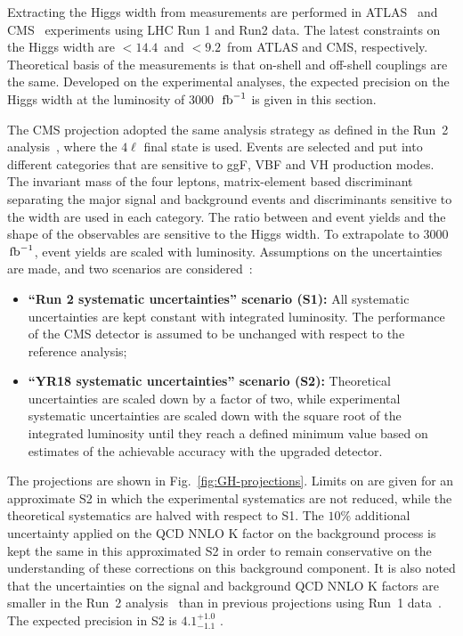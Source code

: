 
Extracting the Higgs width from \offshell measurements are performed in ATLAS~\cite{Aaboud:2018puo} and CMS~\cite{CMS:2018bwq} experiments using LHC Run 1 and Run2 data. The latest constraints on the Higgs width are $< 14.4$~\UMeV and $<9.2$~\UMeV from ATLAS and CMS, respectively. Theoretical basis of the measurements is that on-shell and off-shell couplings are the same. Developed on the experimental analyses, the expected precision on the Higgs width at the luminosity of 3000~$\,{\rm fb}^{-1}$ is given in this section.  

The CMS projection adopted the same analysis strategy as defined in the Run~2 analysis~\cite{CMS-PAS-HIG-18-002}, where the $4\ell$ final state is used. Events are selected and put into different categories that are sensitive to ggF, VBF and VH production modes. The invariant mass of the four leptons, matrix-element based discriminant separating the major signal and background events and discriminants sensitive to the width are used in each category. The ratio between \offshell and \onshell event yields and the shape of the observables are sensitive to the Higgs width. To extrapolate to 3000~$\,{\rm fb}^{-1}$, event yields are scaled with luminosity. Assumptions on the uncertainties are made, and two scenarios are considered~\cite{CMS-PAS-FTR-18-011}:
\begin{itemize}
\item {\bf ``Run 2 systematic uncertainties'' scenario (S1):} All systematic uncertainties are kept constant with
  integrated luminosity. The performance of the CMS detector is
  assumed to be unchanged with respect to the reference analysis;

\item {\bf ``YR18 systematic uncertainties'' scenario (S2):} Theoretical uncertainties are scaled down by a factor of two,
  while experimental systematic uncertainties are scaled down with the
  square root of the integrated luminosity until they reach a defined
  minimum value based on estimates of the achievable accuracy with the
  upgraded detector.
\end{itemize} 

The projections are shown in Fig.~\ref{fig:GH-projections}. Limits on \GH are given for an approximate S2 in which the experimental systematics are not reduced, while the theoretical systematics are halved with respect to S1. The $10\%$ additional uncertainty applied on the QCD NNLO K factor on the \glufu background process is kept the same in this approximated S2 in order to remain conservative on the understanding of these corrections on this background component. It is also noted that the uncertainties on the signal and background QCD NNLO K factors are smaller in the Run~2 analysis~\cite{CMS:2018bwq} than in previous projections using Run~1 data~\cite{ATL-PHYS-PUB-2015-024}. The expected \GH precision in S2 is $4.1 ^{+1.0}_{-1.1}$ \UMeV. 


